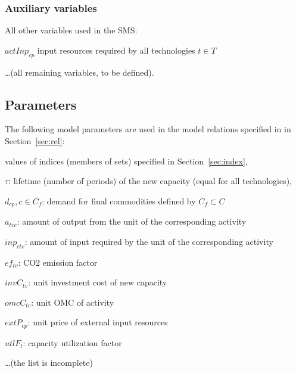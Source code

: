 \documentclass[a4paper,12pt]{article}
\begin{document}
\subsubsection{Auxiliary variables}
All other variables used in the SMS:
\btlb
\item $actInp_{cp}$ input resources required by all technologies $t \in T$
\item \dots (all remaining variables, to be defined).
\etl

\subsection{Parameters}
The following model parameters are used in the model relations 
specified in in Section~\ref{sec:rel}:
\btlb
\item values of indices (members of sets) specified in Section~\ref{sec:index},
\item $\tau$: lifetime (number of periods) of the new capacity (equal for all
	technologies),
\item $d_{cp}, c \in C_f$: demand for final commodities defined by $C_f \subset C$
\item $a_{tvc}$: amount of output from the unit of the corresponding activity
\item $inp_{ctv}$: amount of input required by the unit of the corresponding activity
\item $ef_{tv}$: CO2 emission factor
\item $invC_{tv}$: unit investment cost of new capacity
\item $omcC_{tv}$: unit OMC of activity
\item $extP_{cp}$: unit price of external input resources
\item $utlF_{t}$: capacity utilization factor
\item \dots (the list is incomplete)
\etl
\end{document}
